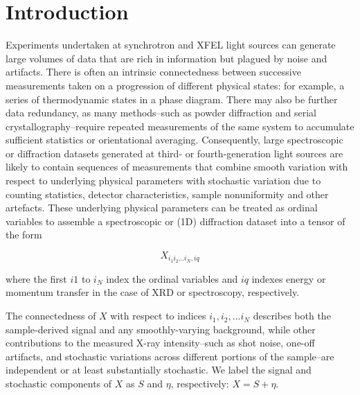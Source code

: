 \documentclass[12pt]{iopart}
\begin{document}
\section{Introduction}
Experiments undertaken at synchrotron and XFEL light sources can generate large volumes of data that are rich in information but plagued by noise and artifacts. There is often an intrinsic connectedness between successive measurements taken on a progression of different physical states: for example, a series of thermodynamic states in a phase diagram. There may also be further data redundancy, as many methods--such as powder diffraction and serial crystallography--require repeated measurements of the same system to accumulate sufficient statistics or orientational averaging. Consequently, large spectroscopic or diffraction datasets generated at third- or fourth-generation light sources are likely to contain sequences of measurements that combine smooth variation with respect to underlying physical parameters with stochastic variation due to counting statistics, detector characteristics, sample nonuniformity and other artefacts. 
These underlying physical parameters can be treated as ordinal variables to assemble a spectroscopic or (1D) diffraction dataset into a tensor of the form 

\begin{equation}
X_{i_1i_2...i_N, iq}
\end{equation}

where the first $i1$ to $i_N$ index the ordinal variables and $iq$ indexes energy or momentum transfer in the case of XRD or spectroscopy,
respectively. 
%

The connectedness of $X$ with respect to indices $i_1, i_2, ... i_N$ describes both the sample-derived signal and any smoothly-varying
background, while other contributions to the measured X-ray
intensity--such as shot noise, one-off artifacts, and stochastic
variations across different portions of the sample--are independent or
at least substantially stochastic. We label the signal and stochastic components of $X$ as $S$ and $\eta$, respectively: $X = S + \eta$. 
\end{document}
